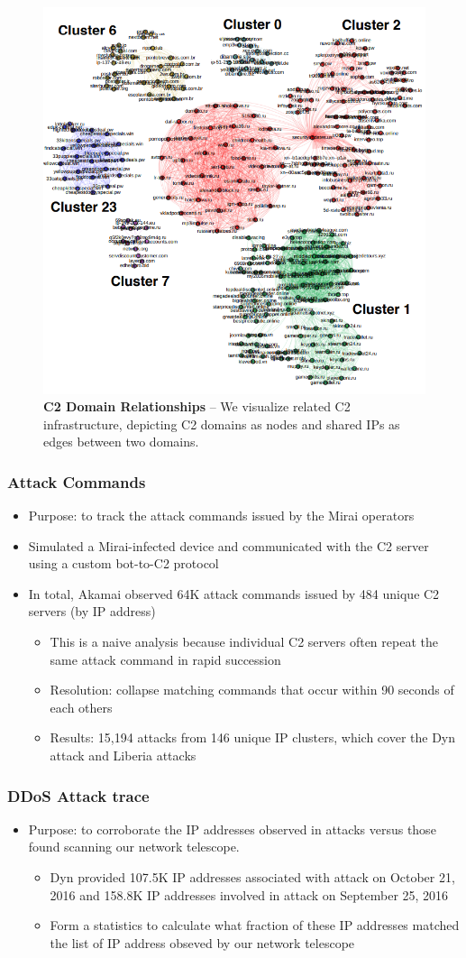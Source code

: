 \documentclass{beamer}
\begin{document}
\begin{frame}
	\begin{figure}
		\includegraphics[width=50 mm, scale = 0.5]{C2DomainRelationship.png}
		\caption{ \textbf{C2 Domain Relationships} -- We visualize related C2 infrastructure, depicting C2 domains as nodes and shared IPs as edges between two domains.}
	\end{figure}
\end{frame}

\begin{frame}
	\frametitle{Attack Commands}
	\begin{itemize}
		\item Purpose: to track the attack commands issued by the Mirai operators
		\item Simulated a Mirai-infected device and communicated with the C2 server using a custom bot-to-C2 protocol
		\item In total, Akamai observed 64K attack commands issued by 484 unique C2 servers  (by IP address)
		\begin{itemize}
			\item This is a naive analysis because individual C2 servers often repeat the same attack command in rapid succession
			\item Resolution: collapse matching commands that occur within 90 seconds of each others
			\item Results: 15,194 attacks from 146 unique IP clusters, which cover the Dyn attack and Liberia attacks
		\end{itemize}
	\end{itemize}
\end{frame}

\begin{frame}
	\frametitle{DDoS Attack trace}
	\begin{itemize}
		\item Purpose: to corroborate the IP addresses observed in attacks versus those found scanning our network telescope.
		\begin{itemize}
			\item Dyn provided 107.5K IP addresses associated
with attack on October 21, 2016 and 158.8K IP addresses involved in attack on September 25, 2016
			\item Form a statistics to calculate what fraction of these IP addresses matched the list of IP address obseved by our network telescope
		\end{itemize}
	\end{itemize}
\end{frame}
\end{document}
